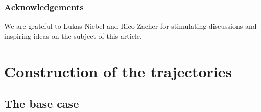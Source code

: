 \documentclass[10pt]{amsart}
\theoremstyle{definition}
\begin{document}
\subsubsection*{Acknowledgements}
We are grateful to Lukas Niebel and Rico Zacher for stimulating discussions and inspiring ideas on the subject of this article.

\section{Construction of the trajectories}
\label{sec:trajectories}

\subsection{The base case}
\label{sec:toy-local}
\end{document}
